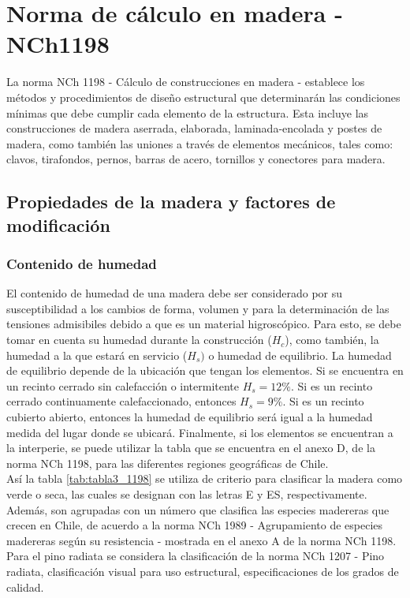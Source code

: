 %
\chapter{Norma de cálculo en madera - NCh1198}
\label{ch:anexo_a}

La norma NCh 1198 - Cálculo de construcciones en madera - establece los métodos y procedimientos de diseño estructural que determinarán las condiciones mínimas que debe cumplir cada elemento de la estructura. Esta incluye las construcciones de madera aserrada, elaborada, laminada-encolada y postes de madera, como también las uniones a través de elementos mecánicos, tales como: clavos, tirafondos, pernos, barras de acero, tornillos y conectores para madera.

\section{Propiedades de la madera y factores de modificación}
\subsection{Contenido de humedad}
\label{sec:contenido_humedad}

El contenido de humedad de una madera debe ser considerado por su susceptibilidad a los cambios de forma, volumen y para la determinación de las tensiones admisibiles debido a que es un material higroscópico. Para esto, se debe tomar en cuenta su humedad durante la construcción ($H_c$), como también, la humedad a la que estará en servicio ($H_s)$ o humedad de equilibrio. La humedad de equilibrio depende de la ubicación que tengan los elementos. Si se encuentra en un recinto cerrado sin calefacción o intermitente $H_s= 12\%$. Si es un recinto cerrado continuamente calefaccionado, entonces $H_s=9\%$. Si es un recinto cubierto abierto, entonces la humedad de equilibrio será igual a la humedad medida del lugar donde se ubicará. Finalmente, si los elementos se encuentran a la interperie, se puede utilizar la tabla que se encuentra en el anexo D, de la norma NCh 1198, para las diferentes regiones geográficas de Chile.\\

Así la tabla \ref{tab:tabla3_1198} se utiliza de criterio para clasificar la madera como verde o seca, las cuales se designan con las letras E y ES, respectivamente. Además, son agrupadas con un número que clasifica las especies madereras que crecen en Chile, de acuerdo a la norma NCh 1989 - Agrupamiento de especies madereras según su resistencia - mostrada en el anexo A de la norma NCh 1198. Para el pino radiata se considera la clasificación de la norma NCh 1207 - Pino radiata, clasificación visual para uso estructural, especificaciones de los grados de calidad.

